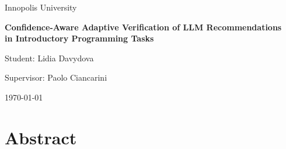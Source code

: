 \documentclass[oneside,final,14pt,a4paper]{extreport}
\begin{document}
\begin{titlepage}
\thispagestyle{empty}
\begin{center}
\vspace*{2cm}
{\large Innopolis University\par}
\vspace{2cm}
{\LARGE\bfseries
Confidence-Aware Adaptive Verification of LLM Recommendations\\
in Introductory Programming Tasks\par}
\vspace{2.5cm}
{\large Student: Lidia Davydova\par}
\vspace{0.5cm}
{\large Supervisor: Paolo Ciancarini\par}
\vfill
{\large \today\par}
\end{center}
\end{titlepage}

\tableofcontents
\newpage

\chapter*{Abstract}
\end{document}
